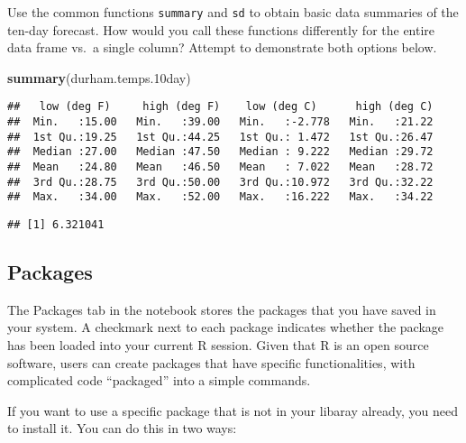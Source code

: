 \documentclass[
]{article}
\newenvironment{Shaded}{\begin{snugshade}}{\end{snugshade}}
\newcommand{\DataTypeTok}[1]{\textcolor[rgb]{0.13,0.29,0.53}{#1}}
\newcommand{\FloatTok}[1]{\textcolor[rgb]{0.00,0.00,0.81}{#1}}
\newcommand{\KeywordTok}[1]{\textcolor[rgb]{0.13,0.29,0.53}{\textbf{#1}}}
\newcommand{\NormalTok}[1]{#1}
\newcommand{\OperatorTok}[1]{\textcolor[rgb]{0.81,0.36,0.00}{\textbf{#1}}}
\newcommand{\StringTok}[1]{\textcolor[rgb]{0.31,0.60,0.02}{#1}}
\begin{document}
Use the common functions \texttt{summary} and \texttt{sd} to obtain
basic data summaries of the ten-day forecast. How would you call these
functions differently for the entire data frame vs.~a single column?
Attempt to demonstrate both options below.

\begin{Shaded}
\begin{Highlighting}[]
\KeywordTok{summary}\NormalTok{(durham.temps}\FloatTok{.10}\NormalTok{day)}
\end{Highlighting}
\end{Shaded}

\begin{verbatim}
##   low (deg F)     high (deg F)    low (deg C)      high (deg C)  
##  Min.   :15.00   Min.   :39.00   Min.   :-2.778   Min.   :21.22  
##  1st Qu.:19.25   1st Qu.:44.25   1st Qu.: 1.472   1st Qu.:26.47  
##  Median :27.00   Median :47.50   Median : 9.222   Median :29.72  
##  Mean   :24.80   Mean   :46.50   Mean   : 7.022   Mean   :28.72  
##  3rd Qu.:28.75   3rd Qu.:50.00   3rd Qu.:10.972   3rd Qu.:32.22  
##  Max.   :34.00   Max.   :52.00   Max.   :16.222   Max.   :34.22
\end{verbatim}

\begin{Shaded}
\end{Shaded}

\begin{verbatim}
## [1] 6.321041
\end{verbatim}

\hypertarget{packages}{%
\subsection{Packages}\label{packages}}

The Packages tab in the notebook stores the packages that you have saved
in your system. A checkmark next to each package indicates whether the
package has been loaded into your current R session. Given that R is an
open source software, users can create packages that have specific
functionalities, with complicated code ``packaged'' into a simple
commands.

If you want to use a specific package that is not in your libaray
already, you need to install it. You can do this in two ways:
\end{document}

